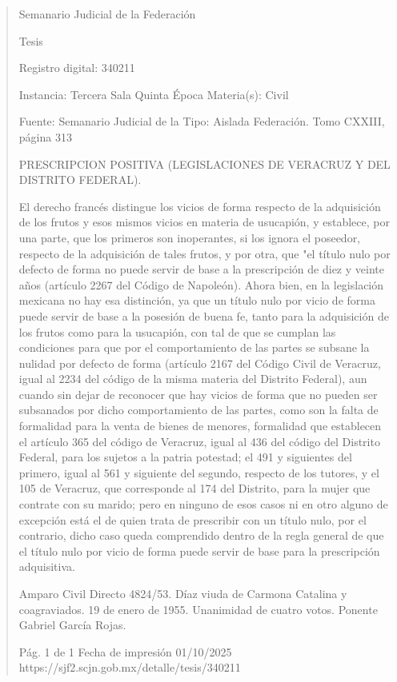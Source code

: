 \documentclass[11pt,a4paper]{article}
\begin{document}
\begin{quote}
                                                   Semanario Judicial de la Federación

                                                  Tesis

 Registro digital: 340211

 Instancia: Tercera Sala          Quinta Época                           Materia(s): Civil

                                  Fuente: Semanario Judicial de la       Tipo: Aislada
                                  Federación.
                                  Tomo CXXIII, página 313


PRESCRIPCION POSITIVA (LEGISLACIONES DE VERACRUZ Y DEL DISTRITO FEDERAL).


El derecho francés distingue los vicios de forma respecto de la adquisición de los frutos y esos
mismos vicios en materia de usucapión, y establece, por una parte, que los primeros son
inoperantes, si los ignora el poseedor, respecto de la adquisición de tales frutos, y por otra, que "el
título nulo por defecto de forma no puede servir de base a la prescripción de diez y veinte años
(artículo 2267 del Código de Napoleón). Ahora bien, en la legislación mexicana no hay esa
distinción, ya que un título nulo por vicio de forma puede servir de base a la posesión de buena fe,
tanto para la adquisición de los frutos como para la usucapión, con tal de que se cumplan las
condiciones para que por el comportamiento de las partes se subsane la nulidad por defecto de
forma (artículo 2167 del Código Civil de Veracruz, igual al 2234 del código de la misma materia del
Distrito Federal), aun cuando sin dejar de reconocer que hay vicios de forma que no pueden ser
subsanados por dicho comportamiento de las partes, como son la falta de formalidad para la venta
de bienes de menores, formalidad que establecen el artículo 365 del código de Veracruz, igual al
436 del código del Distrito Federal, para los sujetos a la patria potestad; el 491 y siguientes del
primero, igual al 561 y siguiente del segundo, respecto de los tutores, y el 105 de Veracruz, que
corresponde al 174 del Distrito, para la mujer que contrate con su marido; pero en ninguno de esos
casos ni en otro alguno de excepción está el de quien trata de prescribir con un título nulo, por el
contrario, dicho caso queda comprendido dentro de la regla general de que el título nulo por vicio de
forma puede servir de base para la prescripción adquisitiva.


Amparo Civil Directo 4824/53. Díaz viuda de Carmona Catalina y coagraviados. 19 de enero de
1955. Unanimidad de cuatro votos. Ponente Gabriel García Rojas.




                                             Pág. 1 de 1              Fecha de impresión 01/10/2025
  https://sjf2.scjn.gob.mx/detalle/tesis/340211

\end{quote}
\end{document}
